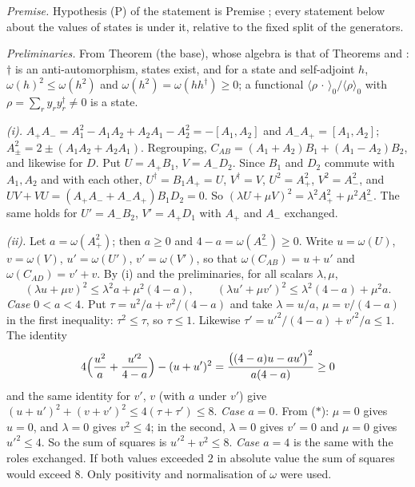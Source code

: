 \emph{Premise.} Hypothesis (P) of the statement is Premise ; every statement below about the values of states is under it, relative to the fixed split of the generators.

\emph{Preliminaries.} From Theorem  (the base), whose algebra is that of Theorems  and : $\dagger$ is an anti-automorphism, states exist, and for a state and self-adjoint $h$, $\omega(h)^{2} \le \omega(h^{2})$ and $\omega(h^{2}) = \omega(hh^{\dagger}) \ge 0$; a functional $\langle\rho\,\cdot\,\rangle_{0}/\langle\rho\rangle_{0}$ with $\rho = \sum_{r}y_{r}y_{r}^{\dagger} \ne 0$ is a state.

\emph{(i).} $A_{+}A_{-} = A_{1}^{2} - A_{1}A_{2} + A_{2}A_{1} - A_{2}^{2} = -[A_{1},A_{2}]$ and $A_{-}A_{+} = [A_{1},A_{2}]$; $A_{\pm}^{2} = 2 \pm (A_{1}A_{2} + A_{2}A_{1})$. Regrouping, $C_{AB} = (A_{1} + A_{2})B_{1} + (A_{1} - A_{2})B_{2}$, and likewise for $D$. Put $U = A_{+}B_{1}$, $V = A_{-}D_{2}$. Since $B_{1}$ and $D_{2}$ commute with $A_{1}, A_{2}$ and with each other, $U^{\dagger} = B_{1}A_{+} = U$, $V^{\dagger} = V$, $U^{2} = A_{+}^{2}$, $V^{2} = A_{-}^{2}$, and $UV + VU = (A_{+}A_{-} + A_{-}A_{+})B_{1}D_{2} = 0$. So $(\lambda U + \mu V)^{2} = \lambda^{2}A_{+}^{2} + \mu^{2}A_{-}^{2}$. The same holds for $U' = A_{-}B_{2}$, $V' = A_{+}D_{1}$ with $A_{+}$ and $A_{-}$ exchanged.

\emph{(ii).} Let $a = \omega(A_{+}^{2})$; then $a \ge 0$ and $4 - a = \omega(A_{-}^{2}) \ge 0$. Write $u = \omega(U)$, $v = \omega(V)$, $u' = \omega(U')$, $v' = \omega(V')$, so that $\omega(C_{AB}) = u + u'$ and $\omega(C_{AD}) = v' + v$. By (i) and the preliminaries, for all scalars $\lambda, \mu$,
\[
(\lambda u + \mu v)^{2} \le \lambda^{2}a + \mu^{2}(4 - a), \qquad (\lambda u' + \mu v')^{2} \le \lambda^{2}(4 - a) + \mu^{2}a . \tag{$*$}
\]
\emph{Case $0 < a < 4$.} Put $\tau = u^{2}/a + v^{2}/(4 - a)$ and take $\lambda = u/a$, $\mu = v/(4 - a)$ in the first inequality: $\tau^{2} \le \tau$, so $\tau \le 1$. Likewise $\tau' = u'^{2}/(4 - a) + v'^{2}/a \le 1$. The identity
\[
4\Bigl(\frac{u^{2}}{a} + \frac{u'^{2}}{4 - a}\Bigr) - (u + u')^{2} = \frac{\bigl((4 - a)u - au'\bigr)^{2}}{a(4 - a)} \ge 0
\]
and the same identity for $v'$, $v$ (with $a$ under $v'$) give $(u + u')^{2} + (v + v')^{2} \le 4(\tau + \tau') \le 8$. \emph{Case $a = 0$.} From ($*$): $\mu = 0$ gives $u = 0$, and $\lambda = 0$ gives $v^{2} \le 4$; in the second, $\lambda = 0$ gives $v' = 0$ and $\mu = 0$ gives $u'^{2} \le 4$. So the sum of squares is $u'^{2} + v^{2} \le 8$. \emph{Case $a = 4$} is the same with the roles exchanged. If both values exceeded $2$ in absolute value the sum of squares would exceed $8$. Only positivity and normalisation of $\omega$ were used.

